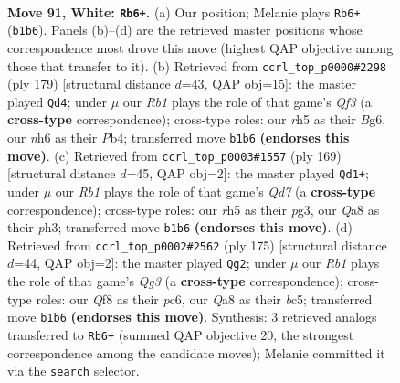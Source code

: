 \documentclass[11pt]{article}
\begin{document}
\clearpage

\begin{figure}[p]\centering
\begin{subfigure}{0.46\textwidth}\centering
\resizebox{\linewidth}{!}{%
\newchessgame
\chessboard[
  setfen={Q4Q2/8/6kn/7r/8/8/8/KR6 w - - 3 91},
  showmover=false,
  pgfstyle=straightmove, color=movearrow, markmove={b1-b6}
]}
\caption{}
\end{subfigure}\hfill
\begin{subfigure}{0.46\textwidth}\centering
\resizebox{\linewidth}{!}{%
\newchessgame
\chessboard[
  setfen={8/4k3/5qb1/8/1p6/1Q4N1/6BK/8 b - - 5 90},
  showmover=false,
  pgfstyle=straightmove, color=movearrow, markmove={f6-d4}
]}
\caption{}
\end{subfigure}
\\[4pt]
\begin{subfigure}{0.46\textwidth}\centering
\resizebox{\linewidth}{!}{%
\newchessgame
\chessboard[
  setfen={8/8/8/8/8/2k3PP/3qR3/5K2 b - - 16 85},
  showmover=false,
  pgfstyle=straightmove, color=movearrow, markmove={d2-d1}
]}
\caption{}
\end{subfigure}\hfill
\begin{subfigure}{0.46\textwidth}\centering
\resizebox{\linewidth}{!}{%
\newchessgame
\chessboard[
  setfen={8/1K3k2/2P3q1/2B5/1R6/8/8/8 b - - 18 88},
  showmover=false,
  pgfstyle=straightmove, color=movearrow, markmove={g6-g2}
]}
\caption{}
\end{subfigure}
\caption{\textbf{Move 91, White: \texttt{Rb6+}.} (a) Our position; Melanie plays \texttt{Rb6+} (\texttt{b1b6}). Panels (b)--(d) are the retrieved master positions whose correspondence most drove this move (highest QAP objective among those that transfer to it). (b) Retrieved from \texttt{ccrl\_top\_p0000\#2298} (ply 179) [structural distance $d$=43, QAP obj=15]: the master played \texttt{Qd4}; under $\mu$ our \emph{Rb1} plays the role of that game's \emph{Qf3} (a \textbf{cross-type} correspondence); cross-type roles: our \emph{r}h5 as their \emph{B}g6, our \emph{n}h6 as their \emph{P}b4; transferred move \texttt{b1b6} \textbf{(endorses this move)}. (c) Retrieved from \texttt{ccrl\_top\_p0003\#1557} (ply 169) [structural distance $d$=45, QAP obj=2]: the master played \texttt{Qd1+}; under $\mu$ our \emph{Rb1} plays the role of that game's \emph{Qd7} (a \textbf{cross-type} correspondence); cross-type roles: our \emph{r}h5 as their \emph{p}g3, our \emph{Q}a8 as their \emph{p}h3; transferred move \texttt{b1b6} \textbf{(endorses this move)}. (d) Retrieved from \texttt{ccrl\_top\_p0002\#2562} (ply 175) [structural distance $d$=44, QAP obj=2]: the master played \texttt{Qg2}; under $\mu$ our \emph{Rb1} plays the role of that game's \emph{Qg3} (a \textbf{cross-type} correspondence); cross-type roles: our \emph{Q}f8 as their \emph{p}c6, our \emph{Q}a8 as their \emph{b}c5; transferred move \texttt{b1b6} \textbf{(endorses this move)}. Synthesis: 3 retrieved analogs transferred to \texttt{Rb6+} (summed QAP objective 20, the strongest correspondence among the candidate moves); Melanie committed it via the \texttt{search} selector.}
\label{fig:thought-m180}
\end{figure}
\end{document}
